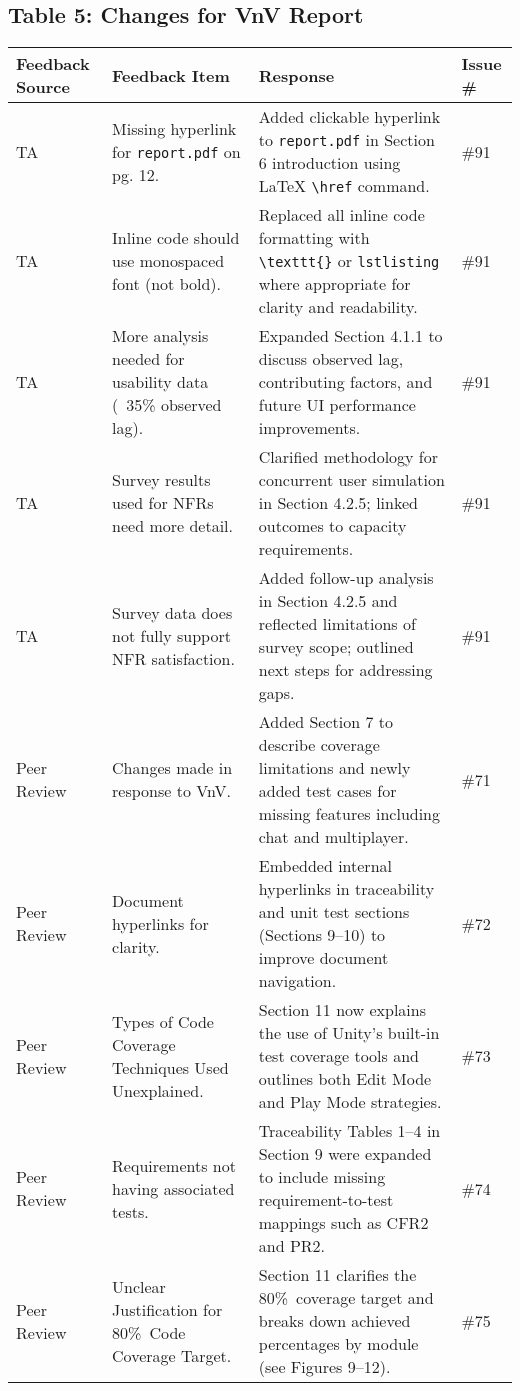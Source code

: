 \documentclass{article}
\begin{document}
\subsection*{Table 5: Changes for VnV Report}
\begin{longtable}{|p{2cm}|p{5cm}|p{5cm}|p{2cm}|}
\hline
\textbf{Feedback Source} & \textbf{Feedback Item} & \textbf{Response} & \textbf{Issue \#} \\
\hline
TA & Missing hyperlink for \texttt{report.pdf} on pg. 12. & Added clickable hyperlink to \texttt{report.pdf} in Section 6 introduction using LaTeX \texttt{\textbackslash href} command. & \#91 \\
\hline
TA & Inline code should use monospaced font (not bold). & Replaced all inline code formatting with \texttt{\textbackslash texttt\{\}} or \texttt{lstlisting} where appropriate for clarity and readability. & \#91 \\
\hline
TA & More analysis needed for usability data (~35\% observed lag). & Expanded Section 4.1.1 to discuss observed lag, contributing factors, and future UI performance improvements. & \#91 \\
\hline
TA & Survey results used for NFRs need more detail. & Clarified methodology for concurrent user simulation in Section 4.2.5; linked outcomes to capacity requirements. & \#91 \\
\hline
TA & Survey data does not fully support NFR satisfaction. & Added follow-up analysis in Section 4.2.5 and reflected limitations of survey scope; outlined next steps for addressing gaps. & \#91 \\
\hline
Peer Review & Changes made in response to VnV. & Added Section 7 to describe coverage limitations and newly added test cases for missing features including chat and multiplayer. & \#71 \\
\hline
Peer Review & Document hyperlinks for clarity. & Embedded internal hyperlinks in traceability and unit test sections (Sections 9–10) to improve document navigation. & \#72 \\
\hline
Peer Review & Types of Code Coverage Techniques Used Unexplained. & Section 11 now explains the use of Unity’s built-in test coverage tools and outlines both Edit Mode and Play Mode strategies. & \#73 \\
\hline
Peer Review & Requirements not having associated tests. & Traceability Tables 1–4 in Section 9 were expanded to include missing requirement-to-test mappings such as CFR2 and PR2. & \#74 \\
\hline
Peer Review & Unclear Justification for 80\%\ Code Coverage Target. & Section 11 clarifies the 80\%\ coverage target and breaks down achieved percentages by module (see Figures 9–12). & \#75 \\

\end{longtable}
\end{document}
